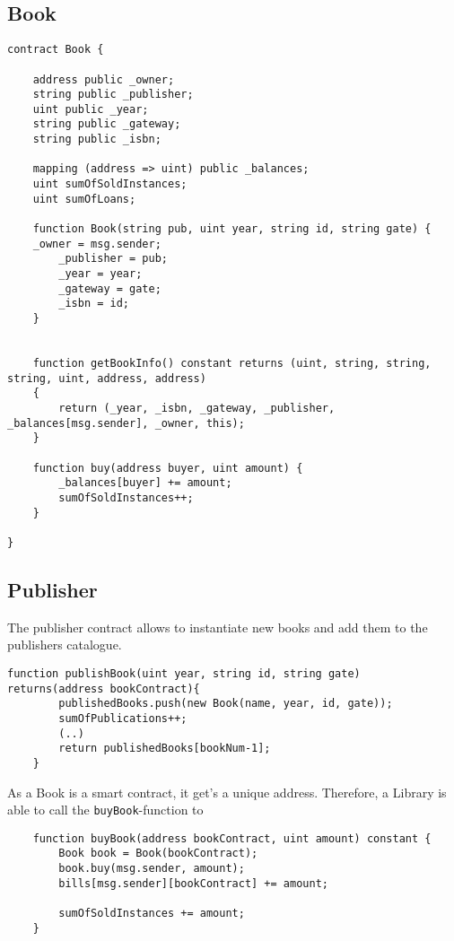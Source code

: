 \subsection{Book}
\begin{lstlisting}
contract Book {

	address public _owner;
	string public _publisher;
	uint public _year;
	string public _gateway;
	string public _isbn;
	
	mapping (address => uint) public _balances;
	uint sumOfSoldInstances;
	uint sumOfLoans;
  
	function Book(string pub, uint year, string id, string gate) {
  	_owner = msg.sender;
		_publisher = pub;
		_year = year;
		_gateway = gate;
		_isbn = id;
	}


	function getBookInfo() constant returns (uint, string, string, 		string, uint, address, address) 
	{
	 	return (_year, _isbn, _gateway, _publisher, 	_balances[msg.sender], _owner, this);
	}

	function buy(address buyer, uint amount) {
		_balances[buyer] += amount;
		sumOfSoldInstances++;
	}

}
\end{lstlisting}

\subsection{Publisher}
The publisher contract allows to instantiate new books and add them to the publishers catalogue.

\begin{lstlisting}
function publishBook(uint year, string id, string gate) returns(address bookContract){
		publishedBooks.push(new Book(name, year, id, gate));
		sumOfPublications++;
		(..)
		return publishedBooks[bookNum-1];
	}
\end{lstlisting}

As a Book is a smart contract, it get's a unique address. Therefore, a Library is able to call the \texttt{buyBook}-function to  



\begin{lstlisting}
	function buyBook(address bookContract, uint amount) constant {
		Book book = Book(bookContract);
		book.buy(msg.sender, amount);	
		bills[msg.sender][bookContract] += amount;

		sumOfSoldInstances += amount;
	}
\end{lstlisting}


